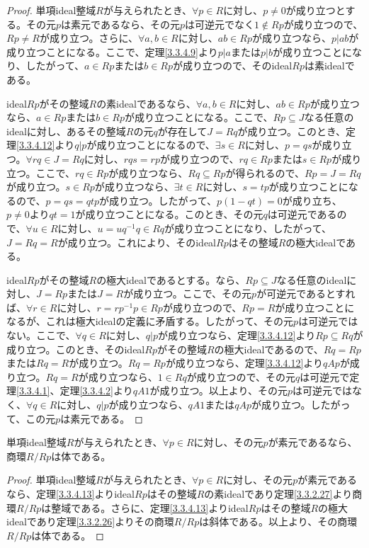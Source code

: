 \documentclass[dvipdfmx]{jsarticle}
\begin{document}
\begin{proof}
単項ideal整域$R$が与えられたとき、$\forall p \in R$に対し、$p \neq 0$が成り立つとする。その元$p$は素元であるなら、その元$p$は可逆元でなく$1 \notin Rp$が成り立つので、$Rp \neq R$が成り立つ。さらに、$\forall a,b \in R$に対し、$ab \in Rp$が成り立つなら、$p|ab$が成り立つことになる。ここで、定理\ref{3.3.4.9}より$p|a$または$p|b$が成り立つことになり、したがって、$a \in Rp$または$b \in Rp$が成り立つので、そのideal$Rp$は素idealである。\par
ideal$Rp$がその整域$R$の素idealであるなら、$\forall a,b \in R$に対し、$ab \in Rp$が成り立つなら、$a \in Rp$または$b \in Rp$が成り立つことになる。ここで、$Rp \subseteq J$なる任意のidealに対し、あるその整域$R$の元$q$が存在して$J = Rq$が成り立つ。このとき、定理\ref{3.3.4.12}より$q|p$が成り立つことになるので、$\exists s \in R$に対し、$p = qs$が成り立つ。$\forall rq \in J = Rq$に対し、$rqs = rp$が成り立つので、$rq \in Rp$または$s \in Rp$が成り立つ。ここで、$rq \in Rp$が成り立つなら、$Rq \subseteq Rp$が得られるので、$Rp = J = Rq$が成り立つ。$s \in Rp$が成り立つなら、$\exists t \in R$に対し、$s = tp$が成り立つことになるので、$p = qs = qtp$が成り立つ。したがって、$p(1 - qt) = 0$が成り立ち、$p \neq 0$より$qt = 1$が成り立つことになる。このとき、その元$q$は可逆元であるので、$\forall u \in R$に対し、$u = uq^{-1}q \in Rq$が成り立つことになり、したがって、$J = Rq = R$が成り立つ。これにより、そのideal$Rp$はその整域$R$の極大idealである。\par
ideal$Rp$がその整域$R$の極大idealであるとする。なら、$Rp \subseteq J$なる任意のidealに対し、$J = Rp$または$J = R$が成り立つ。ここで、その元$p$が可逆元であるとすれば、$\forall r \in R$に対し、$r = rp^{-1}p \in Rp$が成り立つので、$Rp = R$が成り立つことになるが、これは極大idealの定義に矛盾する。したがって、その元$p$は可逆元ではない。ここで、$\forall q \in R$に対し、$q|p$が成り立つなら、定理\ref{3.3.4.12}より$Rp \subseteq Rq$が成り立つ。このとき、そのideal$Rp$がその整域$R$の極大idealであるので、$Rq = Rp$または$Rq = R$が成り立つ。$Rq = Rp$が成り立つなら、定理\ref{3.3.4.12}より$qAp$が成り立つ。$Rq = R$が成り立つなら、$1 \in Rq$が成り立つので、その元$q$は可逆元で定理\ref{3.3.4.1}、定理\ref{3.3.4.2}より$qA1$が成り立つ。以上より、その元$p$は可逆元ではなく、$\forall q \in R$に対し、$q|p$が成り立つなら、$qA1$または$qAp$が成り立つ。したがって、この元$p$は素元である。
\end{proof}
\begin{thm}\label{3.3.4.14}
単項ideal整域$R$が与えられたとき、$\forall p \in R$に対し、その元$p$が素元であるなら、商環${R}/{Rp}$は体である。
\end{thm}
\begin{proof}
単項ideal整域$R$が与えられたとき、$\forall p \in R$に対し、その元$p$が素元であるなら、定理\ref{3.3.4.13}よりideal$Rp$はその整域$R$の素idealであり定理\ref{3.3.2.27}より商環${R}/{Rp}$は整域である。さらに、定理\ref{3.3.4.13}よりideal$Rp$はその整域$R$の極大idealであり定理\ref{3.3.2.26}よりその商環${R}/{Rp}$は斜体である。以上より、その商環${R}/{Rp}$は体である。
\end{proof}
\end{document}
